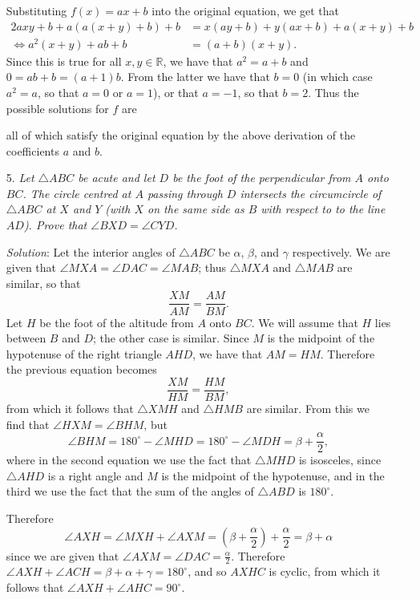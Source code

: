 \documentclass{article}
\begin{document}
\begin{enumerate}
Substituting $f(x) = ax+b$ into the original equation, we get that
\begin{align*}
  2a x y +b +a(a(x+y)+b) +b &= x(a y + b) +y(a x + b) +a(x+y) +b \\
  \iff a^2(x+y) + a b + b &= (a+b)(x+y).
\end{align*}
Since this is true for all $x, y \in \mathbb{R}$, we have that $a^2 = a+b$ and $0 = ab+b = (a+1)b$.
From the latter we have that $b = 0$ (in which case $a^2 = a$, so that $a = 0$ or $a = 1$), or that $a = -1$, so that $b = 2$.
Thus the possible solutions for $f$ are


all of which satisfy the original equation by the above derivation of the coefficients $a$ and $b$.


\item[5.] %
\textit{Let $\triangle ABC$ be acute and let $D$ be the foot of the perpendicular from $A$ onto $BC$.
The circle centred at $A$ passing through $D$ intersects the circumcircle of $\triangle ABC$ at $X$ and $Y$ (with $X$ on the same side as $B$ with respect to to the line $AD$).
Prove that $\angle BXD = \angle CYD$.}

\textit{Solution}:
Let the interior angles of $\triangle ABC$ be $\alpha$, $\beta$, and $\gamma$ respectively.
We are given that $\angle MXA = \angle DAC = \angle MAB$; thus $\triangle MXA$ and $\triangle MAB$ are similar, so that
\[ \frac{XM}{AM} = \frac{AM}{BM}. \]
Let $H$ be the foot of the altitude from $A$ onto $BC$.
We will assume that $H$ lies between $B$ and $D$; the other case is similar.
Since $M$ is the midpoint of the hypotenuse of the right triangle $AHD$, we have that $AM = HM$.
Therefore the previous equation becomes
\[ \frac{XM}{HM} = \frac{HM}{BM}, \]
from which it follows that $\triangle XMH$ and $\triangle HMB$ are similar.
From this we find that $\angle HXM = \angle BHM$, but
\[ \angle BHM = 180^\circ -\angle MHD = 180^\circ -\angle MDH = \beta +\frac{\alpha}{2}, \]
where in the second equation we use the fact that $\triangle MHD$ is isosceles, since $\triangle AHD$ is a right angle and $M$ is the midpoint of the hypotenuse, and in the third we use the fact that the sum of the angles of $\triangle ABD$ is $180^\circ$.

Therefore
\[ \angle AXH = \angle MXH +\angle AXM = \left(\beta+\frac{\alpha}{2}\right) +\frac{\alpha}{2} = \beta +\alpha \]
since we are given that $\angle AXM = \angle DAC = \frac{\alpha}{2}$.
Therefore $\angle AXH +\angle ACH = \beta +\alpha +\gamma = 180^\circ$, and so $AXHC$ is cyclic, from which it follows that $\angle AXH +\angle AHC = 90^\circ$.


\end{enumerate}
\end{document}
